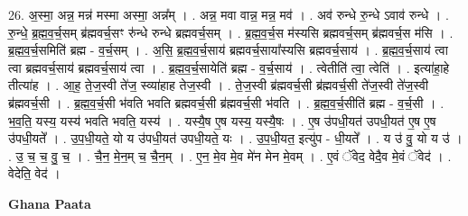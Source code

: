 \documentclass[17pt]{extarticle}
\begin{document}
26. अ॒स्मा॒ अन्न॒ मन्न॑ मस्मा अस्मा॒ अन्न᳚म् । . अन्न॒ मवा वान्न॒ मन्न॒ मव॑ । . अव॑ रुन्धे रु॒न्धे ऽवाव॑ रुन्धे । . रु॒न्धे॒ ब्र॒ह्म॒व॒र्च॒सम् ब्र॑ह्मवर्च॒सꣳ रु॑न्धे रुन्धे ब्रह्मवर्च॒सम् । . ब्र॒ह्म॒व॒र्च॒स म॑स्यसि ब्रह्मवर्च॒सम् ब्र॑ह्मवर्च॒स म॑सि । . ब्र॒ह्म॒व॒र्च॒समिति॑ ब्रह्म - व॒र्च॒सम् । . अ॒सि॒ ब्र॒ह्म॒व॒र्च॒साय॑ ब्रह्मवर्च॒साया᳚स्यसि ब्रह्मवर्च॒साय॑ । . ब्र॒ह्म॒व॒र्च॒साय॑ त्वा त्वा ब्रह्मवर्च॒साय॑ ब्रह्मवर्च॒साय॑ त्वा । . ब्र॒ह्म॒व॒र्च॒सायेति॑ ब्रह्म - व॒र्च॒साय॑ । . त्वेतीति॑ त्वा॒ त्वेति॑ । . इत्या॑हा॒हे तीत्या॑ह । . आ॒ह॒ ते॒ज॒स्वी ते॑ज॒ स्व्या॑हाह तेज॒स्वी । . ते॒ज॒स्वी ब्र॑ह्मवर्च॒सी ब्र॑ह्मवर्च॒सी ते॑ज॒स्वी ते॑ज॒स्वी ब्र॑ह्मवर्च॒सी । . ब्र॒ह्म॒व॒र्च॒सी भ॑वति भवति ब्रह्मवर्च॒सी ब्र॑ह्मवर्च॒सी भ॑वति । . ब्र॒ह्म॒व॒र्च॒सीति॑ ब्रह्म - व॒र्च॒सी । . भ॒व॒ति॒ यस्य॒ यस्य॑ भवति भवति॒ यस्य॑ । . यस्यै॒ष ए॒ष यस्य॒ यस्यै॒षः । . ए॒ष उ॑पधी॒यत॑ उपधी॒यत॑ ए॒ष ए॒ष उ॑पधी॒यते᳚ । . उ॒प॒धी॒यते॒ यो य उ॑पधी॒यत॑ उपधी॒यते॒ यः । . उ॒प॒धी॒यत॒ इत्यु॑प - धी॒यते᳚ । . य उ॑ वु॒ यो य उ॑ । . उ॒ च॒ च॒ वु॒ च॒ । . चै॒न॒ मे॒न॒म् च॒ चै॒न॒म् । . ए॒न॒ मे॒व मे॒व मे॑न मेन मे॒वम् । . ए॒वं ॅवेद॒ वेदै॒व मे॒वं ॅवेद॑ । . वेदेति॒ वेद॑ । \newline

\textbf{Ghana Paata } \newline
\end{document}
